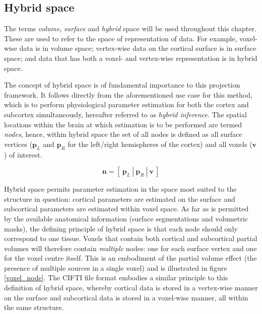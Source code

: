 \documentclass[12pt]{report}
\renewcommand{\vec}[1]{\mathbf{#1}}
\begin{document}
\subsection{Hybrid space}

The terms \textit{volume}, \textit{surface} and \textit{hybrid} space will be used throughout this chapter. These are used to refer to the space of representation of data. For example, voxel-wise data is in volume space; vertex-wise data on the cortical surface is in surface space; and data that has both a voxel- and vertex-wise representation is in hybrid space. 

The concept of hybrid space is of fundamental importance to this projection framework. It follows directly from the aforementioned use case for this method, which is to perform physiological parameter estimation for both the cortex and subcortex simultaneously, hereafter referred to as \textit{hybrid inference}. The spatial locations within the brain at which estimation is to be performed are termed \textit{nodes}, hence, within hybrid space the set of all nodes is defined as all surface vertices ($\vec{p}_L$ and $\vec{p}_R$ for the left/right hemispheres of the cortex) and all voxels ($\vec{v}$) of interest. 

\begin{equation}
\vec{n} = [\ \vec{p}_L \ | \ \vec{p}_R \ | \ \vec{v} \ ] 
\end{equation} 

Hybrid space permits parameter estimation in the space most suited to the structure in question: cortical parameters are estimated on the surface and subcortical parameters are estimated within voxel space. As far as is permitted by the available anatomical information (surface segmentations and volumetric masks), the defining principle of hybrid space is that each node should only correspond to one tissue. Voxels that contain both cortical and subcortical partial volumes will therefore contain \textit{multiple} nodes: one for each surface vertex and one for the voxel centre itself. This is an embodiment of the partial volume effect (the presence of multiple sources in a single voxel) and is illustrated in figure \ref{voxel_node}. The CIFTI file format \cite{cifti} embodies a similar principle to this definition of hybrid space, whereby cortical data is stored in a vertex-wise manner on the surface and subcortical data is stored in a voxel-wise manner, all within the same structure.
\end{document}
